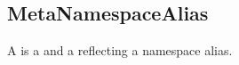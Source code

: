 \subsection{MetaNamespaceAlias}
\label{concept-MetaNamespaceAlias}

A  is a  and a 
reflecting a namespace alias.


